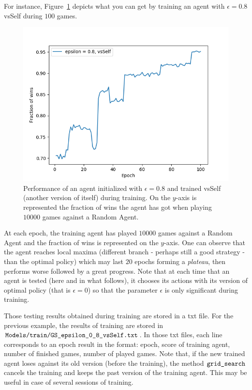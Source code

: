 \documentclass{article}
\begin{document}
For instance, Figure~\ref{fig:training} depicts what you can get by training an agent with $\epsilon = 0.8$ vsSelf during $100$ games.

\begin{figure}[h]
    \centering
    \includegraphics[scale = 0.8]{img/training.png}
    \caption{Performance of an agent initialized with $\epsilon = 0.8$ and trained vsSelf (another version of itself) during training. On the $y$-axis is represented the fraction of wins the agent has got when playing $10000$ games against a Random Agent.}
    \label{fig:training}
\end{figure}{}

At each epoch, the training agent has played $10000$ games against a Random Agent and the fraction of wins is represented on the $y$-axis. One can observe that the agent reaches local maxima (different branch - perhaps still a good strategy - than the optimal policy) which may last $20$ epochs forming a \textit{plateau}, then performs worse followed by a great progress. Note that at each time that an agent is tested (here and in what follows), it chooses its actions with its version of optimal policy (that is $\epsilon = 0$) so that the parameter $\epsilon$ is only significant during training.

Those testing results obtained during training are stored in a txt file. For the previous example, the results of training are stored in $\verb|Models/train/GS_epsilon_0_8_vsSelf.txt|$. In those txt files, each line corresponds to an epoch result in the format: epoch, score of training agent, number of finished games, number of played games. Note that, if the new trained agent loses against its old version (before the training), the method $\verb|grid_search|$ cancels the training and keeps the past version of the training agent. This may be useful in case of several sessions of training.
      
\end{document}
